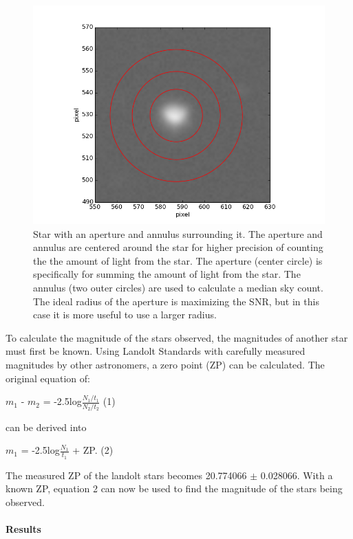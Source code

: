 \documentclass[12 pt,twoside]{article}
\begin{document}
\begin{center}
\begin{figure}[!hb]
\includegraphics[scale=0.5]{figure_4.png}
\caption{\small Star with an aperture and annulus surrounding it. The aperture and annulus are centered around the star for higher precision of counting the the amount of light from the star. The aperture (center circle) is specifically for summing the amount of light from the star. The annulus (two outer circles) are used to calculate a median sky count. The ideal radius of the aperture is maximizing the SNR, but in this case it is more useful to use a larger radius.}
\end{figure}
\end{center}

To calculate the magnitude of the stars observed, the magnitudes of another star must first be known. Using Landolt Standards with carefully measured magnitudes by other astronomers, a zero point (ZP) can be calculated. The original equation of: 
\begin{center}
$m_1$ - $m_2$ = -2.5log$\frac{N_1/t_1}{N_2/t_2}$  (1)

can be derived into
 
$m_1$  = -2.5log$\frac{N_1}{t_1}$ + ZP.              (2)
\end{center}
The measured ZP of the landolt stars becomes 20.774066 $\pm$ 0.028066. With a known ZP, equation 2 can now be used to find the magnitude of the stars being observed.
 


\pagebreak
\paragraph{Results}
\end{document}

